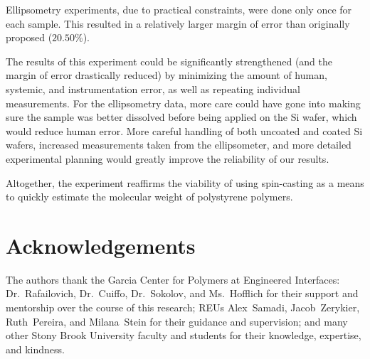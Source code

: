 \documentclass[twocolumn]{article}
\begin{document}
            Ellipsometry experiments, due to practical constraints, were done only once for each sample. This resulted in a relatively larger margin of error than originally proposed ($20.50\%$). 
            
            The results of this experiment could be significantly strengthened (and the margin of error drastically reduced) by minimizing the amount of human, systemic, and instrumentation error, as well as repeating individual measurements. For the ellipsometry data, more care could have gone into making sure the sample was better dissolved before being applied on the Si wafer, which would reduce human error. More careful handling of both uncoated and coated Si wafers, increased measurements taken from the ellipsometer, and more detailed experimental planning would greatly improve the reliability of our results.

            Altogether, the experiment reaffirms the viability of using spin-casting as a means to quickly estimate the molecular weight of polystyrene polymers.

        \section{Acknowledgements}
            The authors thank the Garcia Center for Polymers at Engineered Interfaces: Dr.~Rafailovich, Dr.~Cuiffo, Dr.~Sokolov, and Ms.~Hofflich for their support and mentorship over the course of this research; REUs Alex~Samadi, Jacob~Zerykier, Ruth~Pereira, and Milana~Stein for their guidance and supervision; and many other Stony Brook University faculty and students for their knowledge, expertise, and kindness. 
        \printbibliography
\end{document}
